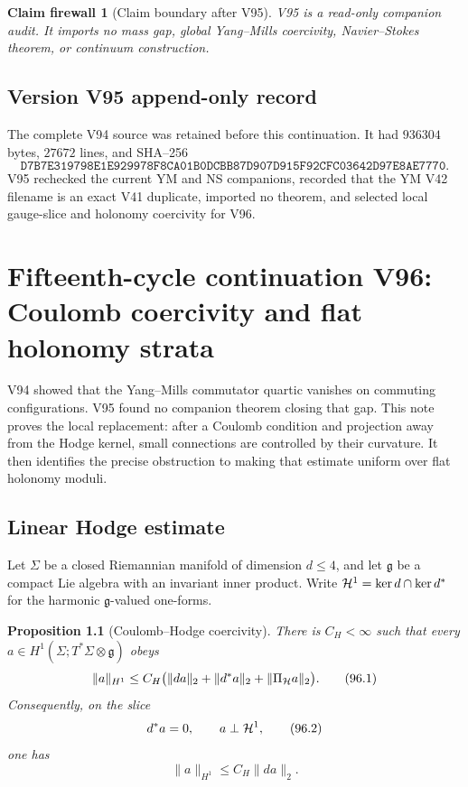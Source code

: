 \documentclass[11pt]{article}
\newtheorem{proposition}[theorem]{Proposition}
\newtheorem{firewall}[theorem]{Claim firewall}
\theoremstyle{remark}
\begin{document}
\begin{firewall}[Claim boundary after V95]
\label{fire:v15v95}
V95 is a read-only companion audit.  It imports no mass gap,
global Yang--Mills coercivity, Navier--Stokes theorem, or continuum
construction.
\end{firewall}

\section*{Version V95 append-only record}
The complete V94 source was retained before this continuation.  It
had \(936304\) bytes, \(27672\) lines, and SHA--256
\[
 \texttt{D7B7E319798E1E929978F8CA01B0DCBB87D907D915F92CFC03642D97E8AE7770}.
\]
V95 rechecked the current YM and NS companions, recorded that the
YM V42 filename is an exact V41 duplicate, imported no theorem, and
selected local gauge-slice and holonomy coercivity for V96.
\chapter{Fifteenth-cycle continuation V96: Coulomb coercivity and flat holonomy strata}
\label{sec:v15v96}

V94 showed that the Yang--Mills commutator quartic vanishes on
commuting configurations.  V95 found no companion theorem closing
that gap.  This note proves the local replacement: after a Coulomb
condition and projection away from the Hodge kernel, small
connections are controlled by their curvature.  It then identifies
the precise obstruction to making that estimate uniform over flat
holonomy moduli.

\section{Linear Hodge estimate}

Let \(\Sigma\) be a closed Riemannian manifold of dimension
\(d\leq4\), and let \(\mathfrak g\) be a compact Lie algebra with an
invariant inner product.  Write
\({\cal H}^1=\ker d\cap\ker d^*\) for the harmonic
\(\mathfrak g\)-valued one-forms.

\begin{proposition}[Coulomb--Hodge coercivity]
\label{prop:v15v96-hodge}
There is \(C_H<\infty\) such that every
\(a\in H^1(\Sigma;T^*\Sigma\otimes\mathfrak g)\) obeys
\[
 \|a\|_{H^1}
 \leq C_H\bigl(
       \|da\|_2+\|d^*a\|_2+\|\Pi_{\cal H}a\|_2\bigr).  \tag{96.1}
\]
Consequently, on the slice
\[
 d^*a=0,\qquad a\perp{\cal H}^1,                      \tag{96.2}
\]
one has
\[
 \|a\|_{H^1}\leq C_H\|da\|_2.                         \tag{96.3}
\]
\end{proposition}
\end{document}
